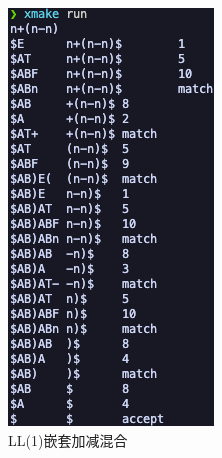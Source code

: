 \begin{figure}[htbp]
\begin{minipage}[t]{0.3\textwidth}
        \includegraphics[width=\textwidth]{images/ll_6.png}
        \caption{LL(1)嵌套加减混合}
        \label{fig:ll-6}
    \end{minipage}
\end{figure}


